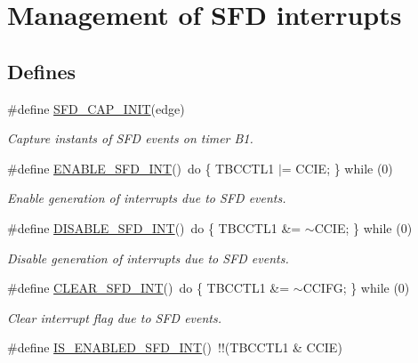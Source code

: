 \hypertarget{group__glossy__sfd}{
\section{Management of SFD interrupts}
\label{group__glossy__sfd}
}
\subsection*{Defines}
\begin{DoxyCompactItemize}
\item 
\#define \hyperlink{group__glossy__sfd_ga770ed5e9afbb20260ce2791cd3159736}{SFD\_\-CAP\_\-INIT}(edge)
\begin{DoxyCompactList}\small\item\em Capture instants of SFD events on timer B1. \end{DoxyCompactList}\item 
\hypertarget{group__glossy__sfd_ga6ba78a35b5699258b8686d954dcbfd68}{
\#define \hyperlink{group__glossy__sfd_ga6ba78a35b5699258b8686d954dcbfd68}{ENABLE\_\-SFD\_\-INT}()~do \{ TBCCTL1 $|$= CCIE; \} while (0)}
\label{group__glossy__sfd_ga6ba78a35b5699258b8686d954dcbfd68}

\begin{DoxyCompactList}\small\item\em Enable generation of interrupts due to SFD events. \end{DoxyCompactList}\item 
\hypertarget{group__glossy__sfd_ga5d2af32ec554abaa0bcaa31d91632af1}{
\#define \hyperlink{group__glossy__sfd_ga5d2af32ec554abaa0bcaa31d91632af1}{DISABLE\_\-SFD\_\-INT}()~do \{ TBCCTL1 \&= $\sim$CCIE; \} while (0)}
\label{group__glossy__sfd_ga5d2af32ec554abaa0bcaa31d91632af1}

\begin{DoxyCompactList}\small\item\em Disable generation of interrupts due to SFD events. \end{DoxyCompactList}\item 
\hypertarget{group__glossy__sfd_ga86745c888328a99fd33f1c9a25b88543}{
\#define \hyperlink{group__glossy__sfd_ga86745c888328a99fd33f1c9a25b88543}{CLEAR\_\-SFD\_\-INT}()~do \{ TBCCTL1 \&= $\sim$CCIFG; \} while (0)}
\label{group__glossy__sfd_ga86745c888328a99fd33f1c9a25b88543}

\begin{DoxyCompactList}\small\item\em Clear interrupt flag due to SFD events. \end{DoxyCompactList}\item 
\hypertarget{group__glossy__sfd_gaf48c215ee6fbfcb0186132170f683ff9}{
\#define \hyperlink{group__glossy__sfd_gaf48c215ee6fbfcb0186132170f683ff9}{IS\_\-ENABLED\_\-SFD\_\-INT}()~!!(TBCCTL1 \& CCIE)}
\label{group__glossy__sfd_gaf48c215ee6fbfcb0186132170f683ff9}


\end{DoxyCompactItemize}
